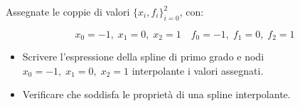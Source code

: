 Assegnate le coppie di valori $\{x_i,f_i \}_{i=0}^2$, con:

$$x_0=-1, \; x_1=0, \; x_2=1 \quad f_0=-1, \; f_1=0, \; f_2=1$$

\begin{itemize}
\item Scrivere l'espressione della spline di primo grado e nodi
$x_0=-1, \; x_1=0, \; x_2=1$ interpolante i valori assegnati.
\item Verificare che soddisfa le propriet\`a di una spline interpolante.

\end{itemize}
